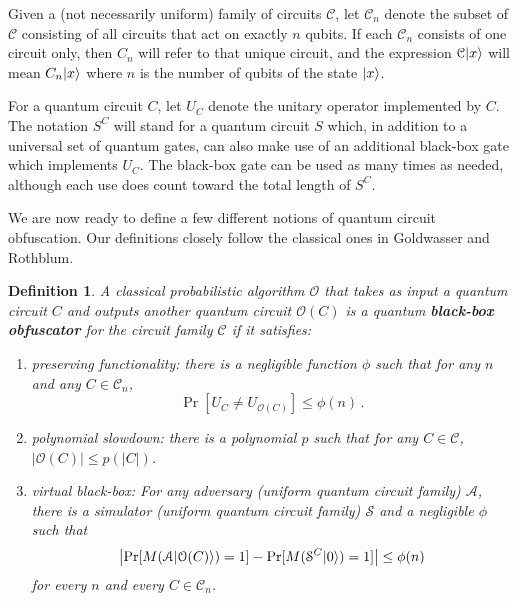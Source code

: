 \documentclass[11pt]{article}
\numberwithin{equation}{section}
\newtheorem{definition}{Definition}
\begin{document}
Given a (not necessarily uniform) family of circuits $\mathcal C$, let $\mathcal C_n$ denote the subset of $\mathcal C$ consisting of all circuits that act on exactly $n$ qubits. If each $\mathcal C_n$ consists of one circuit only, then $C_n$ will refer to that unique circuit, and the expression $\mathcal C {\left\vert{x}\right\rangle}$ will mean $C_n {\left\vert{x}\right\rangle}$ where $n$ is the number of qubits of the state ${\left\vert{x}\right\rangle}$.

For a quantum circuit $C$, let $U_C$ denote the unitary operator implemented by $C$. The notation $S^C$ will stand for a quantum circuit $S$ which, in addition to a universal set of quantum gates, can also make use of an additional black-box gate which implements $U_C$. The black-box gate can be used as many times as needed, although each use does count toward the total length of $S^C$.

We are now ready to define a few different notions of quantum circuit obfuscation. Our definitions closely follow the classical ones in Goldwasser and Rothblum. 

\begin{definition}\label{def:black-box} A classical probabilistic algorithm $\mathcal O$ that takes as input a quantum circuit $C$ and outputs another quantum circuit $\mathcal O(C)$ is a quantum {\bf black-box obfuscator} for the circuit family $\mathcal C$ if it satisfies:
\begin{enumerate}
\item preserving functionality: there is a negligible function $\phi$ such that for any $n$ and any $C \in \mathcal C_n$, 
$$
\Pr[U_C \neq U_{\mathcal O(C)}] \leq \phi(n)\,.
$$
\item polynomial slowdown: there is a polynomial $p$ such that for any $C \in \mathcal C$, $|\mathcal O(C)| \leq p(|C|)$.
\item virtual black-box: For any adversary (uniform quantum circuit family) $\mathcal A$, there is a simulator (uniform quantum circuit family) $\mathcal S$ and a negligible $\phi$ such that
$$
\left| \Pr [M(\mathcal A{\left\vert{\mathcal O(C)}\right\rangle}) = 1] - \Pr[M(\mathcal S^C {\left\vert{0}\right\rangle}) = 1] \right| \leq \phi(n)
$$
for every $n$ and every $C \in \mathcal C_n$.
\end{enumerate}
\end{definition}
\end{document}
